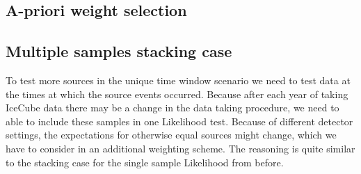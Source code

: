 \subsection{A-priori weight selection}

\subsection{Multiple samples stacking case}
To test more sources in the unique time window scenario we need to test data at the times at which the source events occurred.
Because after each year of taking IceCube data there may be a change in the data taking procedure, we need to able to include these samples in one Likelihood test.
Because of different detector settings, the expectations for otherwise equal sources might change, which we have to consider in an additional weighting scheme.
The reasoning is quite similar to the stacking case for the single sample Likelihood from before.

